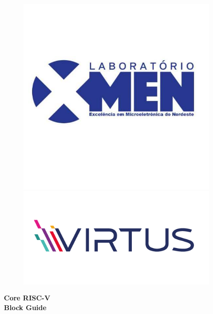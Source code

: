 \begin{titlepage}

\begin{figure}
\centering

\begin{minipage}{0.45\textwidth}
    \centering
    \includegraphics[width=0.9\textwidth]{images/logo.jpg}
\end{minipage}\hfill
\begin{minipage}{0.45\textwidth}
    \centering
    \includegraphics[width=0.9\textwidth]{images/logo_virtus.png}
\end{minipage}

\end{figure}

\vspace{8cm}
\parbox[t]{0.93\textwidth}{ 
\parbox[t]{0.91\textwidth}{
    \centering
    \fontsize{36pt}{40pt}\selectfont
    \vspace{3cm}
    
    \textbf{Core RISC-V \\
    Block Guide}
    
    \vspace{1.5cm}}
}
\end{titlepage}

